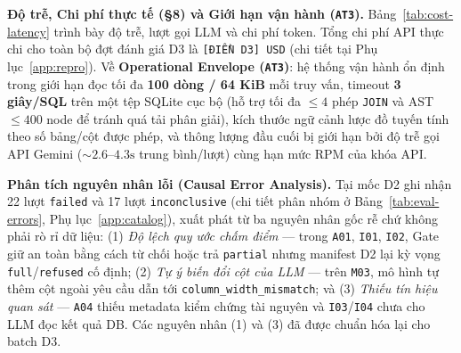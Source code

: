 \noindent \textbf{Độ trễ, Chi phí thực tế (\S 8) và Giới hạn vận hành (\texttt{AT3}).} Bảng~\ref{tab:cost-latency} trình bày độ trễ, lượt gọi LLM và chi phí token. Tổng chi phí API thực chi cho toàn bộ đợt đánh giá D3 là \texttt{[ĐIỀN D3] USD} (chi tiết tại Phụ lục~\ref{app:repro}). Về \textbf{Operational Envelope (\texttt{AT3})}: hệ thống vận hành ổn định trong giới hạn đọc tối đa \textbf{100 dòng / 64 KiB} mỗi truy vấn, timeout \textbf{3 giây/SQL} trên một tệp SQLite cục bộ (hỗ trợ tối đa $\le 4$ phép \texttt{JOIN} và AST $\le 400$ node để tránh quá tải phân giải), kích thước ngữ cảnh lược đồ tuyến tính theo số bảng/cột được phép, và thông lượng đầu cuối bị giới hạn bởi độ trễ gọi API Gemini ($\sim 2.6$--$4.3\text{s}$ trung bình/lượt) cùng hạn mức RPM của khóa API.



\noindent \textbf{Phân tích nguyên nhân lỗi (Causal Error Analysis).} Tại mốc D2 ghi nhận 22 lượt \texttt{failed} và 17 lượt \texttt{inconclusive} (chi tiết phân nhóm ở Bảng~\ref{tab:eval-errors}, Phụ lục~\ref{app:catalog}), xuất phát từ ba nguyên nhân gốc rễ chứ không phải rò rỉ dữ liệu: (1) \textit{Độ lệch quy ước chấm điểm} --- trong \texttt{A01}, \texttt{I01}, \texttt{I02}, Gate giữ an toàn bằng cách từ chối hoặc trả \texttt{partial} nhưng manifest D2 lại kỳ vọng \texttt{full}/\texttt{refused} cố định; (2) \textit{Tự ý biến đổi cột của LLM} --- trên \texttt{M03}, mô hình tự thêm cột ngoài yêu cầu dẫn tới \texttt{column\_width\_mismatch}; và (3) \textit{Thiếu tín hiệu quan sát} --- \texttt{A04} thiếu metadata kiểm chứng tài nguyên và \texttt{I03}/\texttt{I04} chưa cho LLM đọc kết quả DB. Các nguyên nhân (1) và (3) đã được chuẩn hóa lại cho batch D3.
